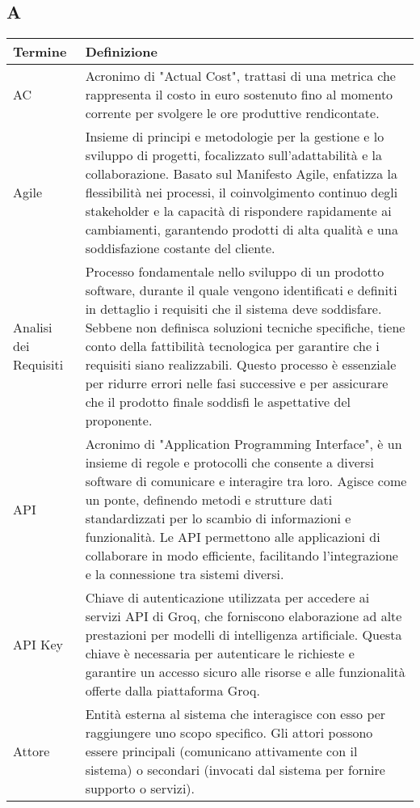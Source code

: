 \documentclass[10pt]{article}
\begin{document}
\subsection{A} %
\begin{longtable}{|>{\centering\arraybackslash}m{2.5cm}|>{\arraybackslash}m{12.5cm}|}
\hline
\rowcolor[gray]{0.8}
\textbf{Termine} & \textbf{Definizione}\\
\endhead
\hline
AC & Acronimo di "Actual Cost", trattasi di una metrica che rappresenta il costo in euro sostenuto fino al momento corrente per svolgere le ore produttive rendicontate.\\
\hline
Agile & Insieme di principi e metodologie per la gestione e lo sviluppo di progetti, focalizzato sull'adattabilità e la collaborazione. Basato sul Manifesto Agile, enfatizza la flessibilità nei processi, il coinvolgimento continuo degli stakeholder e la capacità di rispondere rapidamente ai cambiamenti, garantendo prodotti di alta qualità e una soddisfazione costante del cliente.\\
\hline
Analisi dei Requisiti & Processo fondamentale nello sviluppo di un prodotto software, durante il quale vengono identificati e definiti in dettaglio i requisiti che il sistema deve soddisfare. Sebbene non definisca soluzioni tecniche specifiche, tiene conto della fattibilità tecnologica per garantire che i requisiti siano realizzabili. Questo processo è essenziale per ridurre errori nelle fasi successive e per assicurare che il prodotto finale soddisfi le aspettative del proponente.\\
\hline
API & Acronimo di "Application Programming Interface", è un insieme di regole e protocolli che consente a diversi software di comunicare e interagire tra loro. Agisce come un ponte, definendo metodi e strutture dati standardizzati per lo scambio di informazioni e funzionalità. Le API permettono alle applicazioni di collaborare in modo efficiente, facilitando l'integrazione e la connessione tra sistemi diversi.\\
\hline
API Key & Chiave di autenticazione utilizzata per accedere ai servizi API di Groq, che forniscono elaborazione ad alte prestazioni per modelli di intelligenza artificiale. Questa chiave è necessaria per autenticare le richieste e garantire un accesso sicuro alle risorse e alle funzionalità offerte dalla piattaforma Groq.\\
\hline
Attore & Entità esterna al sistema che interagisce con esso per raggiungere uno scopo specifico. Gli attori possono essere principali (comunicano attivamente con il sistema) o secondari (invocati dal sistema per fornire supporto o servizi).\\
\hline
\end{longtable}
\end{document}
